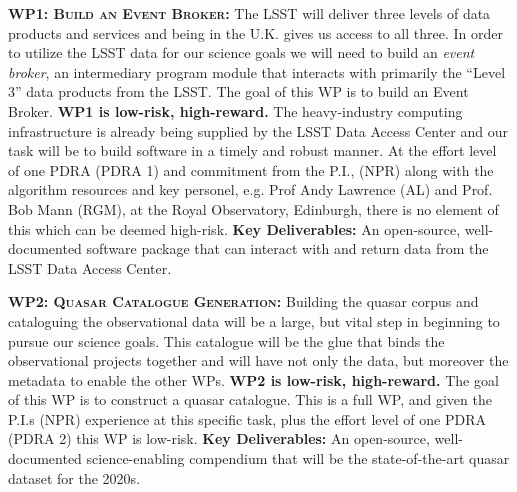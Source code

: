 \documentclass[oneside, a4paper, onecolumn, 11pt]{article}
\begin{document}
\smallskip
\smallskip
\noindent
\textbf{\textsc{WP1: Build an Event Broker:}} 
The LSST will deliver three levels of data products and
services and being in the U.K. gives us access to all three. 
 In order to utilize the LSST data for our science goals we will need to build an {\it event
broker}, an intermediary program module that interacts with primarily
the ``Level 3'' data products from the LSST.
The goal of this WP is to build an Event Broker. 
{\bf WP1 is low-risk, high-reward.} 
The heavy-industry computing infrastructure is already being supplied
by the LSST Data Access Center and our task will be to build software
in a timely and robust manner. At the effort level of one PDRA (PDRA
1) and commitment from the P.I., (NPR) along with the algorithm
resources and key personel, e.g. Prof Andy Lawrence (AL) and Prof. Bob
Mann (RGM), at the Royal Observatory, Edinburgh, there is no element
of this which can be deemed high-risk.  {\bf Key Deliverables:} An
open-source, well-documented software package that can interact with
and return data from the LSST Data Access Center.


\smallskip
\smallskip
\noindent
\textbf{\textsc{WP2: Quasar Catalogue Generation:}} 
Building the quasar corpus and cataloguing the observational data will
be a large, but vital step in beginning to pursue our science
goals. This catalogue will be the glue that binds the observational
projects together and will have not only the data, but moreover the
metadata to enable the other WPs.
{\bf WP2 is low-risk, high-reward.}
The goal of this WP is to construct a quasar catalogue.
This is a full WP, and given the P.I.s (NPR) experience at this
specific task, plus the effort level of one PDRA (PDRA 2) this WP is low-risk. 
{\bf Key Deliverables:} An open-source, well-documented science-enabling compendium that
will be the state-of-the-art quasar dataset for the 2020s. 
\end{document}
